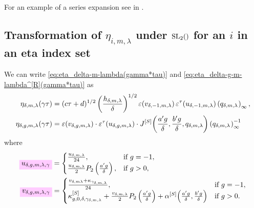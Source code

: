\documentclass{article}
\begin{document}
For an example of a series expansion see
 in
.






\subsection{Transformation of $\eta_{i,m,\lambda}$ under $\SL2Z$ for
  an $i$ in an eta index set}
\label{sec:eta-i-m-lambda}%

We can write \eqref{eq:eta_delta-m-lambda(gamma*tau)}
and \eqref{eq:eta_delta-g-m-lambda^[R](gamma*tau)} as
\begin{align}
  \eta_{\delta,m,\lambda}(\gamma \tau)
  &=
    (c\tau+d)^{1/2}
    \left(\frac{h_{\delta,m,\lambda}}{\delta}\right)^{1/2}
    \unityPower{v_{\delta,-1,m,\lambda}}
    \unityPowerTau{u_{\delta,-1,m,\lambda}}
    \eulerFunction[q_{\delta,m,\lambda}]{},
    \label{eq:eta_delta-m-lambda(gamma*tau)-YEG}
  \\
  \eta_{\delta,g,m,\lambda}(\gamma\tau)
  &=
    \unityPower{v_{\delta,g,m,\lambda}}
    \cdot
    \unityPowerTau{u_{\delta,g,m,\lambda}}
    \cdot
    \jacobiSchoeneberg{\frac{a' g}{\delta}}{\frac{b' g}{\delta}}{q_{\delta,m,\lambda}}
    \eulerFunction[q_{\delta,m,\lambda}]{}^{-1}
    \label{eq:eta_delta-g-m-lambda^[R](gamma*tau)-YEG}
\end{align}
where
\begin{align}
  \defineNotation[u-delta-g-m-lambda-gamma]{u_{\delta,g,m,\lambda,\gamma}}
  &=
  \begin{cases}
    \frac{u_{\delta,m,\lambda}}{24},
    & \text{if $g=-1$},
    \\
    \frac{u_{\delta,m,\lambda}}{2} P_2\left(\frac{a' g}{\delta}\right),
    & \text{if $g>0$},
  \end{cases}
  \label{eq:u_delta-g-m-lambda-gamma}
  \\
  \defineNotation[v-delta-g-m-lambda-gamma]{v_{\delta,g,m,\lambda,\gamma}}
  &=
  \begin{cases}
    \frac{ v_{\delta,m\lambda} + \kappa_{\gamma_{\delta,m,\lambda}}}{24},
    & \text{if $g=-1$},
    \\
    \kappa_{g,0,\delta,\gamma_{\delta,m,\lambda}}^{[S]}
    +
    \frac{v_{\delta,m,\lambda}}{2} P_2\left(\frac{a' g}{\delta}\right)
    +
    \alphaSchoenebergContribution{\frac{a' g}{\delta}}{\frac{b' g}{\delta}}
    & \text{if $g>0$}.
  \end{cases}
  \label{eq:v_delta-g-m-lambda-gamma}
\end{align}
\end{document}
